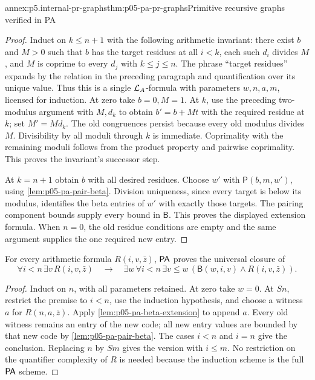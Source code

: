 \begin{annexitem}{annex:p5.internal-pr-graphs}{thm:p05-pa-pr-graphs}{Primitive recursive graphs verified in PA}
\begin{proof}
Induct on \(k\leq n+1\) with the following arithmetic invariant:
there exist \(b\) and \(M>0\) such that \(b\) has the target residues
at all \(i<k\), each such \(d_i\) divides \(M\), and \(M\) is
coprime to every \(d_j\) with \(k\leq j\leq n\).
The phrase ``target residues'' expands by the relation in the preceding
paragraph and quantification over its unique value.  Thus this is a single
\(\mathcal{L}_A\)-formula with parameters \(w,n,a,m\), licensed for induction.
At zero take \(b=0,M=1\).  At \(k\), use the preceding two-modulus
argument with \(M,d_k\) to obtain
\(b'=b+Mt\) with the required residue at \(k\); set \(M'=Md_k\).
The old congruences persist because every old modulus divides \(M\).
Divisibility by all moduli through \(k\) is immediate.  Coprimality with
the remaining moduli follows from the product property and pairwise
coprimality.  This proves the invariant's successor step.

At \(k=n+1\) obtain \(b\) with all desired residues.  Choose \(w'\)
with \(\mathsf P(b,m,w')\), using \cref{lem:p05-pa-pair-beta}.
Division uniqueness, since every target is below its modulus, identifies
the beta entries of \(w'\) with exactly those targets.  The pairing
component bounds supply every bound in \(\mathsf B\).  This proves the
displayed extension formula.  When \(n=0\), the old residue conditions
are empty and the same argument supplies the one required new entry.
\end{proof}

\begin{annexlemma}
\label{lem:p05-pa-finite-collection}
For every arithmetic formula \(R(i,v,\bar z)\), \(\mathsf{PA}\) proves the
universal closure of
\[
 \forall i<n\,\exists v\,R(i,v,\bar z)
 \quad\longrightarrow\quad
 \exists w\,\forall i<n\,\exists v\leq w\,
      (\mathsf B(w,i,v)\land R(i,v,\bar z)).
\]
\end{annexlemma}
\begin{proof}
Induct on \(n\), with all parameters retained.  At zero take \(w=0\).
At \(Sn\), restrict the premise to \(i<n\), use the induction
hypothesis, and choose a witness \(a\) for \(R(n,a,\bar z)\).
Apply \cref{lem:p05-pa-beta-extension} to append \(a\).
Every old witness remains an entry of the new code; all new entry values
are bounded by that new code by \cref{lem:p05-pa-pair-beta}.
The cases \(i<n\) and \(i=n\) give the conclusion.  Replacing \(n\)
by \(Sm\) gives the version with \(i\leq m\).  No restriction on the
quantifier complexity of \(R\) is needed because the induction scheme is
the full \(\mathsf{PA}\) scheme.
\end{proof}


\end{annexitem}
